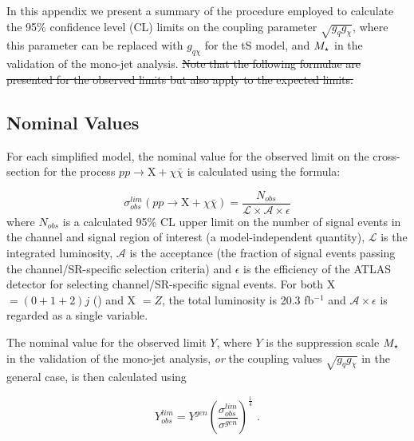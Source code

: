 In this appendix we present a summary of the procedure employed to calculate the 95\% confidence level (CL) limits on the coupling parameter $\sqrt{g_{q}g_{\chi}}$, where this parameter can be replaced with $g_{q \chi}$ for the tS model, and $M_{\star}$ in the validation of the mono-jet analysis. \st{Note that the following formulae are presented for the observed limits but also apply to the expected limits.}

\subsection{Nominal Values}
For each simplified model, the nominal value for the observed limit on the cross-section for the process $pp \rightarrow \mathrm{X} + \chi\bar{\chi}$ is calculated using the formula:

\begin{equation}
\label{sigma_nom}
\sigma_{obs}^{lim}(pp \rightarrow \mathrm{X} + \chi\bar{\chi}) = \frac{N_{obs}}{\mathcal{L}\times\mathcal{A}\times\epsilon}
\end{equation}
where $N_{obs}$ is a calculated 95\% CL upper limit on the number of signal events in the channel and signal region of interest (a model-independent quantity), $\mathcal{L}$ is the integrated luminosity, $\mathcal{A}$ is the acceptance (the fraction of signal events passing the channel/SR-specific selection criteria) and $\epsilon$ is the efficiency of the ATLAS detector for selecting channel/SR-specific signal events. For both X $= (0 + 1 + 2)j$ () and X $=Z$, the total luminosity is 20.3 fb$^{-1}$ and $\mathcal{A}\times\epsilon$ is regarded as a single variable.


The nominal value for the observed limit $Y$, where $Y$ is the suppression scale $M_{\star}$ in the validation of the mono-jet analysis, \emph{or} the coupling values $\sqrt{g_q g_{\chi}}$ in the general case, is then calculated using


\begin{equation}
\label{nom_lim}
Y_{obs}^{lim} = Y^{gen} \left ( \frac{\sigma_{obs}^{lim}}{\sigma^{gen}} \right)^{\frac{1}{4}} \, \, .
\end{equation}

